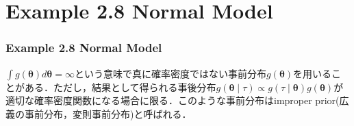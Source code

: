 \documentclass[dvipdfmx,cjk]{beamer}
\theoremstyle{example}
\begin{document}
\section{Example 2.8 Normal Model}
\begin{frame}
    \frametitle{Example 2.8 Normal Model}
    $\int g(\boldsymbol{\theta})d\boldsymbol{\theta}=\infty$という意味で真に確率密度ではない事前分布$g(\boldsymbol{\theta})$を用いることがある．ただし，結果として得られる事後分布$g(\boldsymbol{\theta}\mid\tau)\propto g(\tau\mid\boldsymbol{\theta})g(\boldsymbol{\theta})$が適切な確率密度関数になる場合に限る．このような事前分布はimproper prior(広義の事前分布，変則事前分布)と呼ばれる．
\end{frame}
\end{document}
